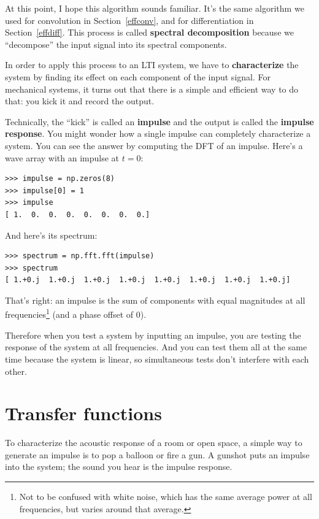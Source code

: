 \documentclass[12pt]{book}
\begin{document}
At this point, I hope this algorithm sounds familiar.  It's the
same algorithm we used for convolution in Section~\ref{effconv}, and
for differentiation in Section~\ref{effdiff}.  This process
is called {\bf spectral decomposition} because we ``decompose''
the input signal into its spectral components.

In order to apply this process to an LTI system, we have to {\bf
  characterize} the system by finding its effect on each component
of the input signal.  For mechanical systems, it turns out that there
is a simple and efficient way to do that: you kick it and record
the output.

Technically, the ``kick'' is called an {\bf impulse} and the
output is called the {\bf impulse response}.  You might wonder
how a single impulse can completely characterize a system.  You
can see the answer by computing the DFT of an impulse.  Here's
a wave array with an impulse at $t=0$:

\begin{verbatim}
>>> impulse = np.zeros(8)
>>> impulse[0] = 1
>>> impulse
[ 1.  0.  0.  0.  0.  0.  0.  0.]
\end{verbatim}

And here's its spectrum:

\begin{verbatim}
>>> spectrum = np.fft.fft(impulse)
>>> spectrum
[ 1.+0.j  1.+0.j  1.+0.j  1.+0.j  1.+0.j  1.+0.j  1.+0.j  1.+0.j]
\end{verbatim}

That's right: an impulse is the sum of components with equal
magnitudes at all frequencies\footnote{Not to be confused with white
  noise, which has the same average power at all frequencies, but
  varies around that average.} (and a phase offset of 0).

Therefore when you test a system by inputting
an impulse, you are testing the response of the 
system at all frequencies.  And you can test them all at the same
time because the system is linear, so simultaneous tests don't
interfere with each other.


\section{Transfer functions}

To characterize the acoustic response of a room or open space, a
simple way to generate an impulse is to pop a balloon or
fire a gun.  A gunshot puts an impulse into
the system; the sound you hear is the impulse response.
\end{document}
